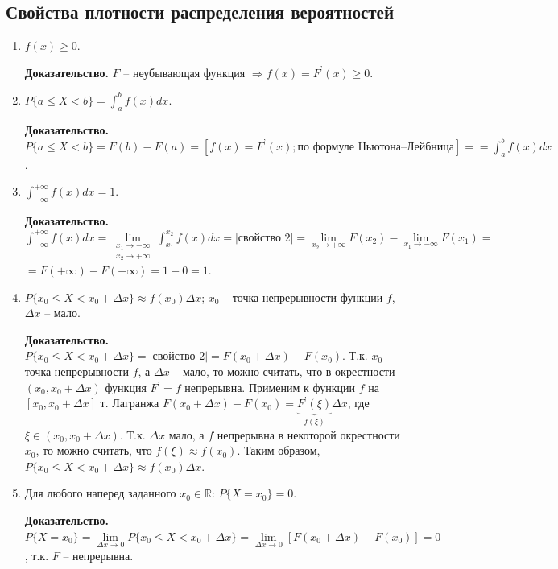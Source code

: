 \subsection*{Свойства плотности распределения вероятностей}
\begin{enumerate}
	\item $f(x) \geq 0$.
	
		\textbf{Доказательство.} $F$ -- неубывающая функция $\Rightarrow f(x) = F^\text{'}(x) \geq 0$.
	
	\item $P\{a \leq X < b\} = \int_{a}^{b}f(x)dx$.
	
		\textbf{Доказательство.} $P\{a \leq X < b\} = F(b) - F(a) = [f(x)=F^\text{'}(x); \text{по формуле Ньютона--Лейбница}] = \text{$=$}\int_{a}^{b}f(x)dx$. 
	
	\item $\int_{-\infty}^{+\infty}f(x)dx = 1$.
	
		\textbf{Доказательство.} $\int_{-\infty}^{+\infty}f(x)dx = \lim\limits_{\substack{x_1 \rightarrow -\infty \\ x_2 \rightarrow +\infty}} \int_{x_1}^{x_2}f(x)dx = |\text{свойство 2}| = \lim\limits_{x_2 \rightarrow +\infty}F(x_2) - \lim\limits_{x_1 \rightarrow -\infty}F(x_1) =$ $=F(+\infty)-F(-\infty)=1-0=1$.
	
	\item $P\{x_0 \leq X < x_0 + \Delta x\} \approx f(x_0)\Delta x$; $x_0$ -- точка непрерывности функции $f$, $\Delta x$ -- мало.
	
		\textbf{Доказательство.} $P\{x_0 \leq X < x_0 + \Delta x\} = |\text{свойство 2}| = F(x_0 + \Delta x) - F(x_0)$. Т.к. $x_0$ -- точка непрерывности $f$, а $\Delta x$ -- мало, то можно считать, что в окрестности $(x_0, x_0 + \Delta x)$ функция $F^\text{'} = f$ непрерывна. Применим к функции $f$ на $[x_0, x_0 + \Delta x]$ т. Лагранжа $F(x_0 + \Delta x) - F(x_0) = \underbrace{F^\text{'}(\xi)}_\text{$f(\xi)$}\Delta x$, где $\xi \in (x_0, x_0 + \Delta x)$. Т.к. $\Delta x$ мало, а $f$ непрерывна в некоторой окрестности $x_0$, то можно считать, что $f(\xi) \approx f(x_0)$. Таким образом, $P\{x_0 \leq X < x_0 + \Delta x\} \approx f(x_0)\Delta x$.
	
	\item Для любого наперед заданного $x_0 \in \mathbb{R}$: $P\{X = x_0\} = 0$.
	
		\textbf{Доказательство.} $P\{X=x_0\}=\lim\limits_{\Delta x \rightarrow 0} P\{x_0 \leq X < x_0 + \Delta x\} = \lim\limits_{\Delta x \rightarrow 0}[F(x_0 + \Delta x) - F(x_0)] = 0$, т.к. $F$ -- непрерывна.
		
\end{enumerate}

